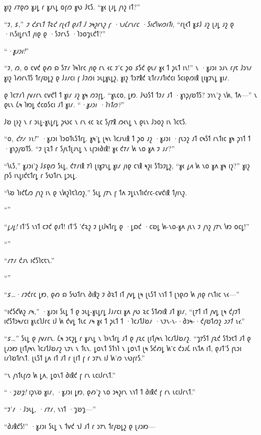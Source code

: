 𐑣𐑦𐑟 𐑥𐑳𐑞𐑼 𐑣𐑨𐑛 𐑩 𐑣𐑨𐑯𐑛 𐑴𐑝𐑼 𐑣𐑻 𐑓𐑱𐑕. “𐑣𐑬 𐑚𐑨𐑛 𐑢𐑪𐑟 𐑦𐑑?”

“𐑲, 𐑭,” \emph{𐑲 𐑒𐑭𐑯𐑑 𐑑𐑷𐑒 𐑩𐑚𐑬𐑑 𐑞𐑨𐑑 𐑓 𐑮𐑰𐑟𐑩𐑯𐑟 𐑝 ·𐑯𐑨𐑖𐑩𐑯𐑩𐑤 ·𐑕𐑦𐑒𐑘𐑫𐑼𐑦𐑑𐑦,} “𐑩𐑚𐑬𐑑 𐑣𐑭𐑓 𐑨𐑟 𐑚𐑨𐑛 𐑨𐑟 𐑞 ·𐑦𐑯𐑕𐑦𐑛𐑩𐑯𐑑 𐑢𐑦𐑞 𐑞 ·𐑕𐑲𐑩𐑯𐑕 ·𐑐𐑮𐑴𐑡𐑧𐑒𐑑?”

“\emph{·𐑣𐑨𐑮𐑦!}”

“𐑲, 𐑼, 𐑴 𐑤𐑫𐑒 𐑞𐑺 𐑸 𐑕𐑳𐑥 𐑐𐑰𐑐𐑩𐑤 𐑢𐑦𐑞 𐑩𐑯 𐑬𐑤 𐑲'𐑤 𐑜𐑴 𐑭𐑕𐑒 𐑞𐑧𐑥 𐑣𐑬 𐑑 𐑜𐑧𐑑 𐑦𐑯!” 𐑯 ·𐑣𐑨𐑮𐑦 𐑮𐑨𐑯 𐑩𐑢𐑱 𐑓𐑮𐑪𐑥 𐑣𐑦𐑟 𐑐𐑺𐑩𐑯𐑑𐑕 𐑑𐑩𐑢𐑹𐑛𐑟 𐑞 𐑓𐑨𐑥𐑤𐑦 𐑝 𐑓𐑲𐑼𐑦 𐑮𐑧𐑛𐑣𐑧𐑛𐑟, 𐑣𐑦𐑟 𐑑𐑮𐑳𐑙𐑒 𐑷𐑑𐑩𐑥𐑨𐑑𐑦𐑒𐑤𐑦 𐑕𐑤𐑦𐑞𐑼𐑦𐑙 𐑚𐑦𐑣𐑲𐑯𐑛 𐑣𐑦𐑥.

𐑞 𐑐𐑤𐑳𐑥𐑐 𐑢𐑫𐑥𐑩𐑯 𐑤𐑫𐑒𐑑 𐑑 𐑣𐑦𐑥 𐑨𐑟 𐑣𐑰 𐑼𐑲𐑝𐑛. “𐑣𐑧𐑤𐑴, 𐑛𐑽. 𐑓𐑻𐑕𐑑 𐑑𐑲𐑥 𐑨𐑑 ·𐑣𐑪𐑜𐑢𐑹𐑑𐑕? 𐑮𐑪𐑯'𐑟 𐑯𐑿, 𐑑𐑵—” 𐑯 𐑞𐑧𐑯 𐑖𐑰 𐑐𐑽𐑛 𐑒𐑤𐑴𐑕𐑤𐑦 𐑨𐑑 𐑣𐑦𐑥. “\emph{·𐑣𐑨𐑮𐑦 ·𐑐𐑪𐑑𐑼?}”

𐑓𐑹 𐑚𐑶𐑟 𐑯 𐑩 𐑮𐑧𐑛-𐑣𐑧𐑛𐑩𐑛 𐑜𐑻𐑤 𐑯 𐑩𐑯 𐑬𐑤 𐑷𐑤 𐑕𐑢𐑳𐑙 𐑼𐑬𐑯𐑛 𐑯 𐑞𐑧𐑯 𐑓𐑮𐑴𐑟 𐑦𐑯 𐑐𐑤𐑱𐑕.

“𐑴, \emph{𐑒𐑳𐑥 𐑪𐑯!}” ·𐑣𐑨𐑮𐑦 𐑐𐑮𐑴𐑑𐑧𐑕𐑑𐑩𐑛. 𐑣𐑰'𐑛 𐑚𐑰𐑯 𐑐𐑤𐑨𐑯𐑦𐑙 𐑑 𐑜𐑴 𐑨𐑟 ·𐑣𐑨𐑮𐑦 ·𐑝𐑧𐑮𐑟 𐑨𐑑 𐑤𐑰𐑕𐑑 𐑩𐑯𐑑𐑦𐑤 𐑣𐑰 𐑜𐑪𐑑 𐑑 ·𐑣𐑪𐑜𐑢𐑹𐑑𐑕. “𐑲 𐑚𐑷𐑑 𐑩 𐑕𐑢𐑧𐑑𐑚𐑨𐑯𐑛 𐑯 𐑧𐑝𐑮𐑦𐑔𐑦𐑙! 𐑣𐑬 𐑒𐑳𐑥 𐑿 𐑯𐑴 𐑣𐑵 𐑲 𐑨𐑥?”

“𐑘𐑧𐑕,” 𐑣𐑨𐑮𐑦'𐑟 𐑓𐑭𐑞𐑼 𐑕𐑧𐑛, 𐑒𐑳𐑥𐑦𐑙 𐑳𐑐 𐑚𐑦𐑣𐑲𐑯𐑛 𐑣𐑦𐑥 𐑢𐑦𐑞 𐑤𐑪𐑙 𐑰𐑟𐑦 𐑕𐑑𐑮𐑲𐑛𐑟, “𐑣𐑬 \emph{𐑛𐑵} 𐑿 𐑯𐑴 𐑣𐑵 𐑣𐑰 𐑦𐑟?” 𐑣𐑦𐑟 𐑝𐑶𐑕 𐑦𐑯𐑛𐑦𐑒𐑱𐑑𐑩𐑛 𐑩 𐑕𐑻𐑑𐑩𐑯 𐑛𐑮𐑧𐑛.

“𐑘𐑹 𐑐𐑦𐑒𐑗𐑼 𐑢𐑪𐑟 𐑦𐑯 𐑞 𐑯𐑿𐑟𐑐𐑱𐑐𐑼𐑟,” 𐑕𐑧𐑛 𐑢𐑳𐑯 𐑝 𐑑𐑵 𐑲𐑛𐑧𐑯𐑑𐑦𐑒𐑩𐑤-𐑤𐑫𐑒𐑦𐑙 𐑑𐑢𐑦𐑯𐑟.

“”

“\emph{𐑛𐑨𐑛!} 𐑦𐑑'𐑕 𐑯𐑪𐑑 𐑤𐑲𐑒 𐑞𐑨𐑑! 𐑦𐑑'𐑕 '𐑒𐑷𐑟 𐑲 𐑛𐑦𐑓𐑰𐑑𐑩𐑛 𐑞 ·𐑛𐑸𐑒 ·𐑤𐑹𐑛 𐑿-𐑯𐑴-𐑣𐑵 𐑢𐑧𐑯 𐑲 𐑢𐑪𐑟 𐑢𐑳𐑯 𐑘𐑽 𐑴𐑤𐑛!”

“”

“𐑥𐑳𐑥 𐑒𐑨𐑯 𐑦𐑒𐑕𐑐𐑤𐑱𐑯.”

“”

“𐑭…·𐑥𐑲𐑒𐑩𐑤 𐑛𐑽, 𐑞𐑺 𐑸 𐑕𐑻𐑑𐑩𐑯 𐑔𐑦𐑙𐑟 𐑲 𐑔𐑷𐑑 𐑦𐑑 𐑢𐑫𐑛 𐑚𐑰 𐑚𐑧𐑕𐑑 𐑯𐑪𐑑 𐑑 𐑚𐑪𐑞𐑼 𐑿 𐑢𐑦𐑞 𐑩𐑯𐑑𐑦𐑤 𐑯𐑬—”

“𐑦𐑒𐑕𐑒𐑿𐑟 𐑥𐑰,” ·𐑣𐑨𐑮𐑦 𐑕𐑧𐑛 𐑑 𐑞 𐑮𐑧𐑛-𐑣𐑧𐑛𐑩𐑛 𐑓𐑨𐑥𐑤𐑦 𐑣𐑵 𐑢𐑻 𐑷𐑤 𐑕𐑑𐑺𐑦𐑙 𐑨𐑑 𐑣𐑦𐑥, “𐑚𐑳𐑑 𐑦𐑑 𐑢𐑫𐑛 𐑚𐑰 𐑒𐑢𐑲𐑑 𐑦𐑒𐑕𐑑𐑮𐑰𐑥𐑤𐑦 𐑣𐑧𐑤𐑐𐑓𐑩𐑤 𐑦𐑓 𐑿 𐑒𐑫𐑛 𐑑𐑧𐑤 𐑥𐑰 𐑣𐑬 𐑑 𐑜𐑧𐑑 𐑑 ·𐑐𐑤𐑨𐑑𐑓𐑹𐑥 ·𐑯𐑲𐑯-𐑯-·𐑔𐑮𐑰-·𐑒𐑢𐑹𐑑𐑼𐑟 \emph{𐑮𐑲𐑑 𐑯𐑬}.”

“𐑭…” 𐑕𐑧𐑛 𐑞 𐑢𐑫𐑥𐑩𐑯. 𐑖𐑰 𐑮𐑱𐑟𐑛 𐑩 𐑣𐑨𐑯𐑛 𐑯 𐑐𐑶𐑯𐑑𐑩𐑛 𐑨𐑑 𐑞 𐑢𐑷𐑤 𐑚𐑦𐑑𐑢𐑰𐑯 𐑐𐑤𐑨𐑑𐑓𐑹𐑥𐑟. “𐑡𐑳𐑕𐑑 𐑢𐑷𐑒 𐑕𐑑𐑮𐑱𐑑 𐑨𐑑 𐑞 𐑚𐑨𐑮𐑽 𐑚𐑦𐑑𐑢𐑰𐑯 𐑐𐑤𐑨𐑑𐑓𐑹𐑥𐑟 𐑯𐑲𐑯 𐑯 𐑑𐑧𐑯. 𐑛𐑴𐑯𐑑 𐑕𐑑𐑪𐑐 𐑯 𐑛𐑴𐑯𐑑 𐑚𐑰 𐑕𐑒𐑺𐑛 𐑿'𐑤 𐑒𐑮𐑨𐑖 𐑦𐑯𐑑𐑵 𐑦𐑑, 𐑞𐑨𐑑'𐑕 𐑝𐑧𐑮𐑦 𐑦𐑥𐑐𐑹𐑑𐑩𐑯𐑑. 𐑚𐑧𐑕𐑑 𐑛𐑵 𐑦𐑑 𐑨𐑑 𐑩 𐑚𐑦𐑑 𐑝 𐑩 𐑮𐑳𐑯 𐑦𐑓 𐑿'𐑼 𐑯𐑻𐑝𐑩𐑕.”

“𐑯 𐑢𐑪𐑑𐑧𐑝𐑼 𐑿 𐑛𐑵, 𐑛𐑴𐑯𐑑 𐑔𐑦𐑙𐑒 𐑝 𐑩𐑯 𐑧𐑤𐑦𐑓𐑩𐑯𐑑.”

“\emph{·𐑡𐑹𐑡!} 𐑦𐑜𐑯𐑹 𐑣𐑦𐑥, ·𐑣𐑨𐑮𐑦 𐑛𐑽, 𐑞𐑺'𐑟 𐑯𐑴 𐑮𐑰𐑟𐑩𐑯 𐑯𐑪𐑑 𐑑 𐑔𐑦𐑙𐑒 𐑝 𐑩𐑯 𐑧𐑤𐑦𐑓𐑩𐑯𐑑.”

“𐑲'𐑥 ·𐑓𐑮𐑧𐑛, ·𐑥𐑳𐑥, 𐑯𐑪𐑑 ·𐑡𐑹𐑡—”

“𐑔𐑨𐑙𐑒𐑕!” ·𐑣𐑨𐑮𐑦 𐑕𐑧𐑛 𐑯 𐑑𐑫𐑒 𐑪𐑓 𐑨𐑑 𐑩 𐑮𐑳𐑯 𐑑𐑩𐑢𐑹𐑛𐑟 𐑞 𐑚𐑨𐑮𐑽—

